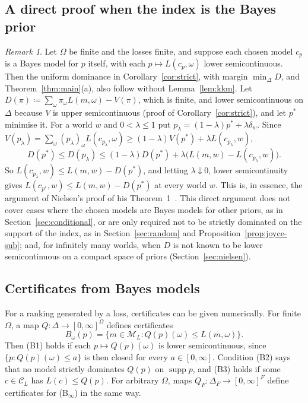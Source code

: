 \documentclass[11pt]{article}
\theoremstyle{definition}
\theoremstyle{remark}
\newtheorem{remark}[theorem]{Remark}
\newcommand{\M}{\mathcal M}
\newcommand{\C}{\mathcal C}
\newcommand{\supp}{\operatorname{supp}}
\begin{document}
\subsection{A direct proof when the index is the Bayes prior}\label{sec:direct}
\begin{remark}\label{rem:direct}
Let $\Omega$ be finite and the losses finite, and suppose each chosen model $c_p$ is a Bayes model for $p$ itself, with each $p\mapsto L(c_p,\omega)$ lower semicontinuous. Then the uniform dominance in Corollary~\ref{cor:strict}, with margin $\min_\Delta D$, and Theorem~\ref{thm:main}(a), also follow without Lemma~\ref{lem:kkm}. Let $D(\pi)\coloneqq \sum_\omega\pi_\omega L(m,\omega)-V(\pi)$, which is finite, and lower semicontinuous on $\Delta$ because $V$ is upper semicontinuous (proof of Corollary~\ref{cor:strict}), and let $p^*$ minimise it. For a world $w$ and $0<\lambda\le1$ put $p_\lambda=(1-\lambda)p^*+\lambda\delta_w$. Since $V(p_\lambda)=\sum_\omega(p_\lambda)_\omega L(c_{p_\lambda},\omega)\ge(1-\lambda)V(p^*)+\lambda L(c_{p_\lambda},w)$,
\[
 D(p^*)\le D(p_\lambda)\le(1-\lambda)D(p^*)+\lambda\bigl(L(m,w)-L(c_{p_\lambda},w)\bigr).
\]
So $L(c_{p_\lambda},w)\le L(m,w)-D(p^*)$, and letting $\lambda\downarrow0$, lower semicontinuity gives $L(c_{p^*},w)\le L(m,w)-D(p^*)$ at every world $w$. This is, in essence, the argument of Nielsen's proof of his Theorem~1~\cite[Appendix~C]{Nielsen}. This direct argument does not cover cases where the chosen models are Bayes models for other priors, as in Section~\ref{sec:conditional}, or are only required not to be strictly dominated on the support of the index, as in Section~\ref{sec:random} and Proposition~\ref{prop:joyce-sub}; and, for infinitely many worlds, when $D$ is not known to be lower semicontinuous on a compact space of priors (Section~\ref{sec:nielsen}).
\end{remark}

\subsection{Certificates from Bayes models}\label{sec:bayesbounds}
For a ranking generated by a loss, certificates can be given numerically. For finite $\Omega$, a map $Q:\Delta\to[0,\infty]^\Omega$ defines certificates
\[
 B_\omega(p)=\{m\in\M_L:Q(p)(\omega)\le L(m,\omega)\}.
\]
Then (B1) holds if each $p\mapsto Q(p)(\omega)$ is lower semicontinuous, since $\{p:Q(p)(\omega)\le a\}$ is then closed for every $a\in[0,\infty]$. Condition (B2) says that no model strictly dominates $Q(p)$ on $\supp p$, and (B3) holds if some $c\in\C_L$ has $L(c)\le Q(p)$. For arbitrary $\Omega$, maps $Q_F:\Delta_F\to[0,\infty]^F$ define certificates for (B$_\infty$) in the same way.
\end{document}
